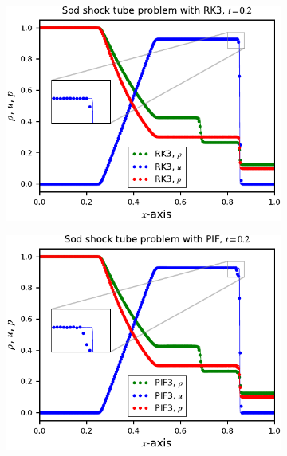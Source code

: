\begin{figure}
    \centering
    \begin{subfigure}{0.49\textwidth}
        \centering
        \includegraphics[width=\textwidth]{fig/sod_rk3}
        \caption{}\label{subfig:sod_rk3}
    \end{subfigure}
    \begin{subfigure}{0.49\textwidth}
        \centering
        \includegraphics[width=\textwidth]{fig/sod_pif3}
        \caption{}\label{subfig:sod_pif3}
    \end{subfigure}
    \begin{subfigure}{0.49\textwidth}
        \centering

\end{subfigure}
\end{figure}
